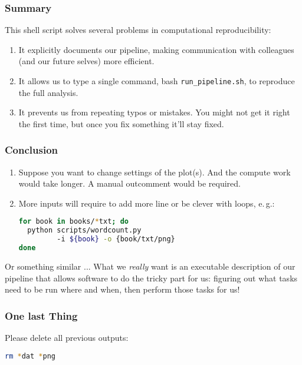 \begin{frame}
  \frametitle{Summary}
  This  shell script solves several problems in computational reproducibility:
  \begin{enumerate}[<+->]
   \item It explicitly documents our pipeline, making communication with colleagues (and our future selves) more efficient.
   \item It allows us to type a single command, bash \texttt{run\_pipeline.sh}, to reproduce the full analysis.
   \item It prevents us from repeating typos or mistakes. You might not get it right the first time, but once you fix something it’ll stay fixed.
  \end{enumerate}
  \pause
\end{frame}

\begin{frame}[fragile]
  \frametitle{Conclusion}
  \begin{enumerate}[<+->]
   \item Suppose you want to change settings of the plot(s). And the compute work would take longer. A manual outcomment would be required.
   \item More inputs will require to add more line or be clever with loops, e.\,g.:
         \begin{lstlisting}[language=Bash, style=Shell]
for book in books/*txt; do 
  python scripts/wordcount.py 
         -i ${book} -o {book/txt/png}
done
         \end{lstlisting}
  \end{enumerate}
  Or something similar ...\newline
  What we \emph{really} want is an executable description of our pipeline that allows software to do the tricky part for us: figuring out what tasks need to be run where and when, then perform those tasks for us!
\end{frame}

\begin{frame}[fragile]
  \frametitle{One last Thing}
  Please delete all previous outputs:
  \begin{lstlisting}[language=Bash, style=Shell]
rm *dat *png 
  \end{lstlisting}
\end{frame}




